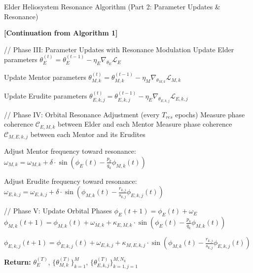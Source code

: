 \begin{algorithm}
\caption{Elder Heliosystem Resonance Algorithm (Part 2: Parameter Updates \& Resonance)}
\begin{algorithmic}[1]
\Statex \textbf{[Continuation from Algorithm 1]}

    \State // Phase III: Parameter Updates with Resonance Modulation
    \State Update Elder parameters $\theta_E^{(t)} = \theta_E^{(t-1)} - \eta_E \nabla_{\theta_E} \mathcal{L}_E$
    
        \State Update Mentor parameters $\theta_{M,k}^{(t)} = \theta_{M,k}^{(t-1)} - \eta_M \nabla_{\theta_{M,k}} \mathcal{L}_{M,k}$
        
            \State Update Erudite parameters $\theta_{E,k,j}^{(t)} = \theta_{E,k,j}^{(t-1)} - \eta_E \nabla_{\theta_{E,k,j}} \mathcal{L}_{E,k,j}$
        \EndFor
    \EndFor
    
    \State // Phase IV: Orbital Resonance Adjustment (every $T_{res}$ epochs)
        \State Measure phase coherence $\mathcal{C}_{E,M,k}$ between Elder and each Mentor
        \State Measure phase coherence $\mathcal{C}_{M,E,k,j}$ between each Mentor and its Erudites
        
            \State Adjust Mentor frequency toward resonance:
            \State \quad $\omega_{M,k} = \omega_{M,k} + \delta \cdot \sin(\phi_E(t) - \frac{p_k}{q_k}\phi_{M,k}(t))$
            
                \State Adjust Erudite frequency toward resonance:
                \State \quad $\omega_{E,k,j} = \omega_{E,k,j} + \delta \cdot \sin(\phi_{M,k}(t) - \frac{r_{k,j}}{s_{k,j}}\phi_{E,k,j}(t))$
            \EndFor
        \EndFor
    \EndIf
    
    \State // Phase V: Update Orbital Phases
    \State $\phi_E(t+1) = \phi_E(t) + \omega_E$
        \State $\phi_{M,k}(t+1) = \phi_{M,k}(t) + \omega_{M,k} + \kappa_{E,M,k} \cdot \sin(\phi_E(t) - \frac{p_k}{q_k}\phi_{M,k}(t))$
        
            \State $\phi_{E,k,j}(t+1) = \phi_{E,k,j}(t) + \omega_{E,k,j} + \kappa_{M,E,k,j} \cdot \sin(\phi_{M,k}(t) - \frac{r_{k,j}}{s_{k,j}}\phi_{E,k,j}(t))$
        \EndFor
    \EndFor
\EndFor

\State \textbf{Return:} $\theta_E^{(T)}$, $\{\theta_{M,k}^{(T)}\}_{k=1}^M$, $\{\theta_{E,k,j}^{(T)}\}_{k=1,j=1}^{M,N_k}$
\end{algorithmic}
\end{algorithm}

